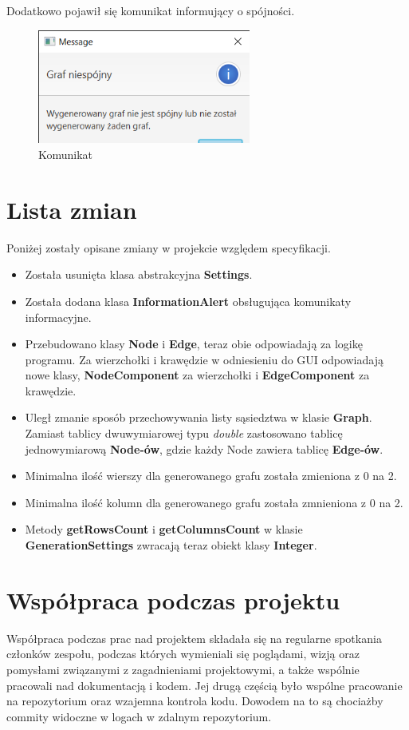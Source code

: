 \documentclass{article}
\begin{document}
\begin{itemize}
    Dodatkowo pojawił się komunikat informujący o spójności.
    
    \begin{figure}[ht]
        \centering
        \includegraphics[width=7cm]{Images/Message.png}
        \caption{Komunikat}
        \label{fig:g4}
    \end{figure}
    
\end{itemize}

\newpage
\section{Lista zmian}
Poniżej zostały opisane zmiany w projekcie względem specyfikacji. 

\begin{itemize}
    \item Została usunięta klasa abstrakcyjna \textbf{Settings}.
    \item Została dodana klasa \textbf{InformationAlert} obsługująca komunikaty informacyjne.
    \item Przebudowano klasy \textbf{Node} i \textbf{Edge}, teraz obie odpowiadają za logikę programu. Za wierzchołki i krawędzie w odniesieniu do GUI odpowiadają nowe klasy, \textbf{NodeComponent} za wierzchołki i \textbf{EdgeComponent} za krawędzie.
    \item Uległ zmanie sposób przechowywania listy sąsiedztwa w klasie \textbf{Graph}. Zamiast tablicy dwuwymiarowej typu \textit{double} zastosowano tablicę jednowymiarową \textbf{Node-ów}, gdzie każdy Node zawiera tablicę \textbf{Edge-ów}.
    \item Minimalna ilość wierszy dla generowanego grafu została zmieniona z 0 na 2.
    \item Minimalna ilość kolumn dla generowanego grafu została zmnieniona z 0 na 2.
    \item Metody \textbf{getRowsCount} i \textbf{getColumnsCount} w klasie \textbf{GenerationSettings} zwracają teraz obiekt klasy \textbf{Integer}.
\end{itemize}

\section{Współpraca podczas projektu}
Współpraca podczas prac nad projektem składała się na regularne spotkania członków zespołu, podczas których wymieniali się poglądami, wizją oraz pomysłami związanymi z zagadnieniami projektowymi, a także wspólnie pracowali nad dokumentacją i kodem. Jej drugą częścią było wspólne pracowanie na repozytorium oraz wzajemna kontrola kodu. Dowodem na to są chociażby commity widoczne w logach w zdalnym repozytorium.
\end{document}
